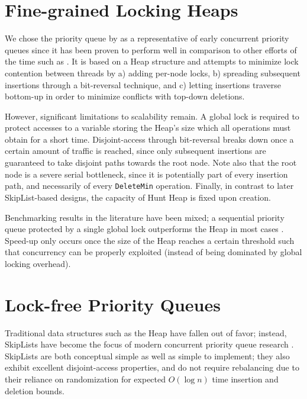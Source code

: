 \documentclass[a4paper,10pt]{article}
\begin{document}
\section{Fine-grained Locking Heaps} \label{sec:hunt}

We chose the priority queue by \citeauthor{hunt1996efficient} \cite{hunt1996efficient}
as a representative of early concurrent priority queues since it has been proven to
perform well \cite{shavit2000skiplist} in comparison to other efforts of the time such as \cite{nageshwara1988concurrent,ayani1990lr,yan1998lock}. %
It is based on a Heap
structure and attempts to minimize lock contention between threads by a) adding per-node
locks, b) spreading subsequent insertions through a bit-reversal technique, %
and c) letting insertions traverse bottom-up in order to minimize conflicts with
top-down deletions.

However, significant limitations to scalability remain. A global lock is required
to protect accesses to a variable storing the Heap's size which all operations
must obtain for a short time. Disjoint-access through bit-reversal breaks down
once a certain amount of traffic is reached, since only subsequent insertions
are guaranteed to take disjoint paths towards the root node. Note also that
the root node is a severe serial bottleneck, since it is potentially part of
every insertion path, and necessarily of every \lstinline|DeleteMin| operation.
Finally, in contrast to later SkipList-based designs, the capacity of Hunt Heap
is fixed upon creation.

Benchmarking results in the literature have been mixed; a sequential priority
queue protected by a single global lock outperforms the \citeauthor{hunt1996efficient}
Heap in most cases \cite{hunt1996efficient,sundell2003fast}. Speed-up only occurs once
the size of the Heap reaches a certain threshold such that concurrency
can be properly exploited (instead of being dominated by global locking overhead).

\section{Lock-free Priority Queues}

Traditional data structures such as the Heap have fallen out of favor;
instead, SkipLists \cite{pugh1990skip,pugh1998concurrent} have become the focus
of modern concurrent priority queue research
\cite{shavit2000skiplist,sundell2003fast,herlihy2012art,linden2013skiplist,alistarhspraylist}.
SkipLists are both conceptual simple as well as simple to implement; they also exhibit
excellent disjoint-access properties, and do not require rebalancing due to their
reliance on randomization for expected $O(\log n)$ time insertion and deletion bounds.
\end{document}
